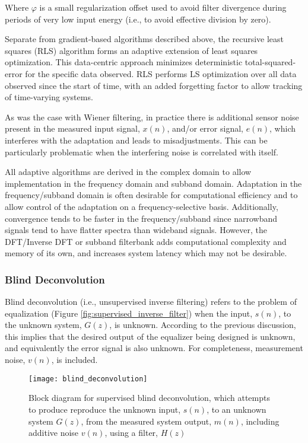 \noindent
Where $\varphi$ is a small regularization offset used to avoid filter divergence during periods of very low input energy (i.e., to avoid effective division by zero).

Separate from gradient-based algorithms described above, the recursive least squares (RLS) algorithm forms an adaptive extension of least squares optimization. This data-centric approach minimizes deterministic total-squared-error for the specific data observed. RLS performs LS optimization over all data observed since the start of time, with an added forgetting factor to allow tracking of time-varying systems.

As was the case with Wiener filtering, in practice there is additional sensor noise present in the measured input signal, $x(n)$, and/or error signal, $e(n)$, which interferes with the adaptation and leads to misadjustments. This can be particularly problematic when the interfering noise is correlated with itself.

All adaptive algorithms are derived in the complex domain to allow implementation in the frequency domain and subband domain. Adaptation in the frequency/subband domain is often desirable for computational efficiency and to allow control of the adaptation on a frequency-selective basis. Additionally, convergence tends to be faster in the frequency/subband since narrowband signals tend to have flatter spectra than wideband signals. However, the DFT/Inverse DFT or subband filterbank adds computational complexity and memory of its own, and increases system latency which may not be desirable.


\subsubsection{Blind Deconvolution}

Blind deconvolution (i.e., unsupervised inverse filtering) refers to the problem of equalization (Figure \ref{fig:supervised_inverse_filter}) when the input, $s(n)$, to the unknown system, $G(z)$, is unknown. According to the previous discussion, this implies that the desired output of the equalizer being designed is unknown, and equivalently the error signal is also unknown. For completeness, measurement noise, $v(n)$, is included.

\begin{figure}[H]
	\texttt{[image: blind\_deconvolution]}
	\centering
	\caption{Block diagram for supervised blind deconvolution, which attempts to produce reproduce the unknown input, $s(n)$, to an unknown system $G(z)$, from the measured system output, $m(n)$, including additive noise $v(n)$, using a filter, $H(z)$}
	\label{fig:blind_deconvolution}
\end{figure}

